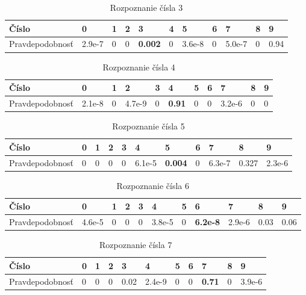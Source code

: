 \begin{table}[H]
  \begin{tabular}{ | l | l | l | l | l | l | l | l | l | l | l |}
    \hline
    Číslo & 0 & 1 & 2 & 3 & 4 & 5 & 6 & 7 & 8 & 9 \\ \hline
    Pravdepodobnosť & 2.9e-7 & 0 & 0 & \textbf{0.002} & 0 & 3.6e-8 & 0 & 5.0e-7 & 0 & 0.94 \\
    \hline
  \end{tabular}
  \caption[Rozpoznanie čísla 3]{Rozpoznanie čísla 3}
\end{table}

\begin{table}[H]
  \begin{tabular}{ | l | l | l | l | l | l | l | l | l | l | l |}
    \hline
    Číslo & 0 & 1 & 2 & 3 & 4 & 5 & 6 & 7 & 8 & 9 \\ \hline
    Pravdepodobnosť & 2.1e-8 & 0 & 4.7e-9 & 0 & \textbf{0.91} & 0 & 0 & 3.2e-6 & 0 & 0 \\
    \hline
  \end{tabular}
  \caption[Rozpoznanie čísla 4]{Rozpoznanie čísla 4}
\end{table}

\begin{table}[H]
  \begin{tabular}{ | l | l | l | l | l | l | l | l | l | l | l |}
    \hline
    Číslo & 0 & 1 & 2 & 3 & 4 & 5 & 6 & 7 & 8 & 9 \\ \hline
    Pravdepodobnosť & 0 & 0 & 0 & 0 & 6.1e-5 & \textbf{0.004} & 0 & 6.3e-7 & 0.327 & 2.3e-6 \\
    \hline
  \end{tabular}
  \caption[Rozpoznanie čísla 5]{Rozpoznanie čísla 5}
\end{table}

\begin{table}[H]
  \begin{tabular}{ | l | l | l | l | l | l | l | l | l | l | l |}
    \hline
    Číslo & 0 & 1 & 2 & 3 & 4 & 5 & 6 & 7 & 8 & 9 \\ \hline
    Pravdepodobnosť & 4.6e-5 & 0 & 0 & 0 & 3.8e-5 & 0 & \textbf{6.2e-8} & 2.9e-6 & 0.03 & 0.06 \\
    \hline
  \end{tabular}
  \caption[Rozpoznanie čísla 6]{Rozpoznanie čísla 6}
\end{table}

\begin{table}[H]
  \begin{tabular}{ | l | l | l | l | l | l | l | l | l | l | l |}
    \hline
    Číslo & 0 & 1 & 2 & 3 & 4 & 5 & 6 & 7 & 8 & 9 \\ \hline
    Pravdepodobnosť & 0 & 0 & 0 & 0.02 & 2.4e-9 & 0 & 0 & \textbf{0.71} & 0 & 3.9e-6 \\
    \hline
  \end{tabular}
  \caption[Rozpoznanie čísla 7]{Rozpoznanie čísla 7}
\end{table}

